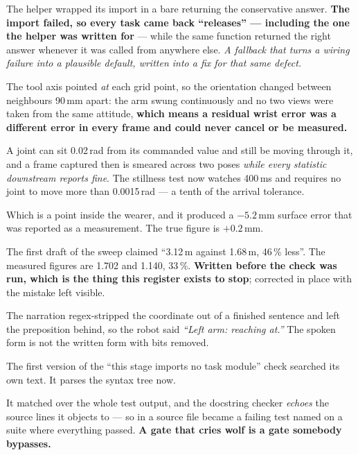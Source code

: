 {The helper wrapped its import in a bare  returning the conservative
answer. \textbf{The import failed, so every task came back ``releases'' ---
including the one the helper was written for} --- while the same function
returned the right answer whenever it was called from anywhere else.
\emph{A fallback that turns a wiring failure into a plausible default, written
into a fix for that same defect.}}

{The tool axis pointed \emph{at} each grid point, so the orientation changed
between neighbours 90\,mm apart: the arm swung continuously and no two views were
taken from the same attitude, \textbf{which means a residual wrist error was a
different error in every frame and could never cancel or be measured.}}

{A joint can sit 0.02\,rad from its commanded value and still be moving through
it, and a frame captured then is smeared across two poses \emph{while every
statistic downstream reports fine}. The stillness test now watches 400\,ms and
requires no joint to move more than 0.0015\,rad --- a tenth of the arrival
tolerance.}

{Which is a point inside the wearer, and it produced a $-5.2$\,mm surface error
that was reported as a measurement. The true figure is $+0.2$\,mm.}

{The first draft of the sweep claimed ``3.12\,m against 1.68\,m, 46\,\% less''.
The measured figures are 1.702 and 1.140, 33\,\%. \textbf{Written before the
check was run, which is the thing this register exists to stop};
corrected in place with the mistake left visible.}

{The narration regex-stripped the coordinate out of a finished sentence and left
the preposition behind, so the robot said \emph{``Left arm: reaching at.''}
The spoken form is not the written form with bits removed.}

{The first version of the ``this stage imports no task module'' check searched
its own text. It parses the syntax tree now.}

{It matched  over the whole test output, and
the docstring checker \emph{echoes} the source lines it objects to --- so
 in a source file became a failing test named \code{=} on
a suite where everything passed. \textbf{A gate that cries wolf is a gate
somebody bypasses.}}


